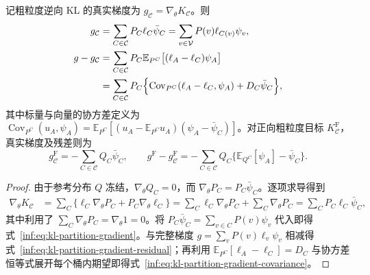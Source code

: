 \documentclass[lang=cn,scheme=chinese,openany]{elegantbook}
\newcommand{\E}{\mathbb E}
\begin{document}
\begin{theorem}
\label{inf:thm:kl-partition-gradient}
记粗粒度逆向 KL 的真实梯度为 $g_{\mathcal C}=\nabla_\theta K_{\mathcal C}$。则
\begin{align}
 g_{\mathcal C}
 &=\sum_{C\in\mathcal C}P_C\ell_C\bar \psi_C
  =\sum_{v\in\mathcal V}P(v)\ell_{C(v)}\psi_v,
 \label{inf:eq:kl-partition-gradient}\\
 g-g_{\mathcal C}
 &=\sum_{C\in\mathcal C}P_C\E_{P^C}\bigl[(\ell_A-\ell_C)\psi_A\bigr]
 \label{inf:eq:kl-partition-gradient-residual}\\
 &=\sum_{C\in\mathcal C}P_C\Bigl\{
       \operatorname{Cov}_{P^C}(\ell_A-\ell_C,\psi_A)
       +D_C\bar \psi_C\Bigr\},
 \label{inf:eq:kl-partition-gradient-covariance}
\end{align}
其中标量与向量的协方差定义为 $\operatorname{Cov}_{P^C}(u_A,\psi_A)=\E_{P^C}[(u_A-\E_{P^C}u_A)(\psi_A-\bar \psi_C)]$。对正向粗粒度目标 $K_{\mathcal C}^{\mathrm F}$，真实梯度及残差则为
\begin{equation*}
 g^{\mathrm F}_{\mathcal C}=-\sum_{C\in\mathcal C}Q_C\bar \psi_C,
 \qquad
 g^{\mathrm F}-g^{\mathrm F}_{\mathcal C}
 =-\sum_{C\in\mathcal C}Q_C\bigl\{\E_{Q^C}[\psi_A]-\bar \psi_C\bigr\}.
\end{equation*}
\end{theorem}
\begin{proof}
由于参考分布 $Q$ 冻结，$\nabla_\theta Q_C=0$，而 $\nabla_\theta P_C=P_C\bar \psi_C$。逐项求导得到
\begin{align*}
 \nabla_\theta K_{\mathcal C}
 &=\sum_C\bigl\{\ell_C\nabla_\theta P_C+P_C\nabla_\theta\ell_C\bigr\}
 =\sum_C\ell_C\nabla_\theta P_C+\sum_C\nabla_\theta P_C
 =\sum_C P_C\ell_C\bar \psi_C,
\end{align*}
其中利用了 $\sum_C\nabla_\theta P_C=\nabla_\theta 1=0$。将 $P_C\bar \psi_C=\sum_{v\in C}P(v)\psi_v$ 代入即得式~\eqref{inf:eq:kl-partition-gradient}。与完整梯度 $g=\sum_v P(v)\ell_v\psi_v$ 相减得式~\eqref{inf:eq:kl-partition-gradient-residual}；再利用 $\E_{P^C}[\ell_A-\ell_C]=D_C$ 与协方差恒等式展开每个桶内期望即得式~\eqref{inf:eq:kl-partition-gradient-covariance}。
\end{proof}
\end{document}
